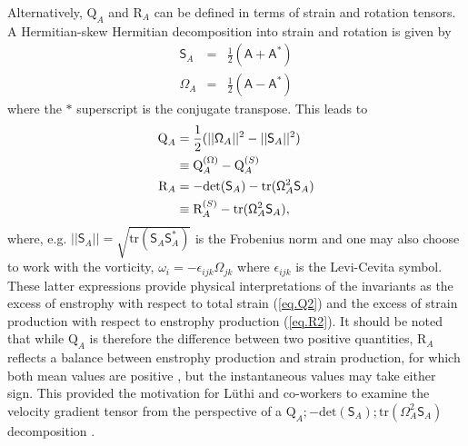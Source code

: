 \documentclass[preprint,amssymb,amsmath,aip,cha]{revtex4-1}
\begin{document}
Alternatively, $\mbox{Q}_{A}$ and $\mbox{R}_{A}$ can be defined in terms of strain and rotation tensors. A Hermitian-skew Hermitian decomposition into strain and rotation is given by 
\begin{eqnarray}
\mathsf{S}_{A} &=& \frac{1}{2}(\mathsf{A} + \mathsf{A}^{*}) \\
\mathsf{\Omega}_{A} &=& \frac{1}{2}(\mathsf{A} - \mathsf{A}^{*})
\label{eq.SOmegavort}
\end{eqnarray}
where the $*$ superscript is the conjugate transpose. This leads to 
\begin{align}
\label{eq.Q2}
\notag
\mbox{Q}_{A} &= \frac{1}{2} (||\mathsf{\Omega}_{A}||^{2} - ||\mathsf{S}_{A}||^{2}) \\
&\equiv \mbox{Q}^{(\Omega)}_{A} - \mbox{Q}^{(S)}_{A}\\
\notag
\mbox{R}_{A} &= -\mbox{det}(\mathsf{S}_{A}) - \mbox{tr}(\mathsf{\Omega}_{A}^{2}\mathsf{S}_{A}) \\
&\equiv \mbox{R}^{(S)}_{A} - \mbox{tr}(\mathsf{\Omega}_{A}^{2}\mathsf{S}_{A}),
\label{eq.R2}
\end{align} 
where, e.g. $||\mathsf{S}_{A}|| = \sqrt{\mbox{tr}(\mathsf{S}_{A}\mathsf{S}_{A}^{*})}$ is the Frobenius norm and one may also choose to work with the vorticity, $\omega_{i} = -\epsilon_{ijk}\Omega_{jk}$ where $\epsilon_{ijk}$ is the Levi-Cevita symbol. These latter expressions provide physical interpretations of the invariants as the excess of enstrophy with respect to total strain (\ref{eq.Q2}) and the excess of strain production with respect to enstrophy production (\ref{eq.R2}). It should be noted that while $\mbox{Q}_{A}$ is therefore the difference between two positive quantities, $\mbox{R}_{A}$ reflects a balance between enstrophy production and strain production, for which both mean values are positive \citep{taylor38,betchov56}, but the instantaneous values may take either sign. This provided the motivation for L\"{u}thi and co-workers to examine the velocity gradient tensor from the perspective of a $\mbox{Q}_{A}; -\mbox{det}(\mathsf{S}_{A}); \mbox{tr}(\mathsf{\Omega}_{A}^{2}\mathsf{S}_{A})$ decomposition \citep{luthi09}. 
\end{document}
